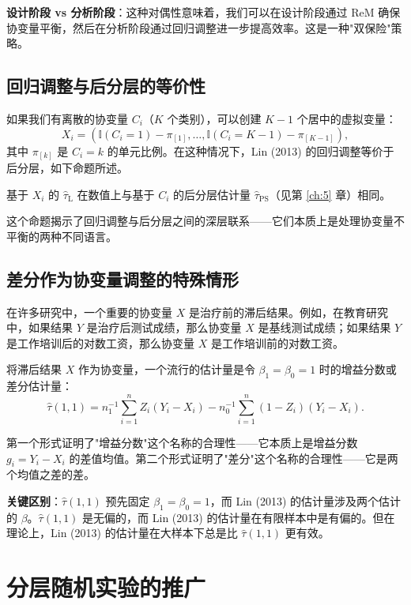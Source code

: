 \textbf{设计阶段 vs 分析阶段}：这种对偶性意味着，我们可以在设计阶段通过 ReM 确保协变量平衡，然后在分析阶段通过回归调整进一步提高效率。这是一种"双保险"策略。

\subsection{回归调整与后分层的等价性}\label{sec:6-equivalence}

如果我们有离散的协变量 $C_i$（$K$ 个类别），可以创建 $K-1$ 个居中的虚拟变量：
\[
X_i = \left( \mathbb{I}(C_i = 1) - \pi_{[1]}, \ldots, \mathbb{I}(C_i = K-1) - \pi_{[K-1]} \right) ,
\]
其中 $\pi_{[k]}$ 是 $C_i = k$ 的单元比例。在这种情况下，Lin (2013) 的回归调整等价于后分层，如下命题所述。

\begin{Proposition}[命题 6.3 — 回归调整与后分层的等价性]\label{prop:6.3}
基于 $X_i$ 的 $\hat{\tau}_{\mathrm{L}}$ 在数值上与基于 $C_i$ 的后分层估计量 $\hat{\tau}_{\mathrm{PS}}$（见第 \ref{ch:5} 章）相同。
\end{Proposition}

这个命题揭示了回归调整与后分层之间的深层联系——它们本质上是处理协变量不平衡的两种不同语言。

\subsection{差分作为协变量调整的特殊情形}\label{sec:6-did}

在许多研究中，一个重要的协变量 $X$ 是治疗前的滞后结果。例如，在教育研究中，如果结果 $Y$ 是治疗后测试成绩，那么协变量 $X$ 是基线测试成绩；如果结果 $Y$ 是工作培训后的对数工资，那么协变量 $X$ 是工作培训前的对数工资。

将滞后结果 $X$ 作为协变量，一个流行的估计量是令 $\beta_1 = \beta_0 = 1$ 时的增益分数或差分估计量：
\[
\hat{\tau}(1,1) = n_1^{-1}\sum_{i=1}^n Z_i (Y_i - X_i) - n_0^{-1}\sum_{i=1}^n (1-Z_i)(Y_i - X_i) .
\]

第一个形式证明了"增益分数"这个名称的合理性——它本质上是增益分数 $g_i = Y_i - X_i$ 的差值均值。第二个形式证明了"差分"这个名称的合理性——它是两个均值之差的差。

\textbf{关键区别}：$\hat{\tau}(1,1)$ 预先固定 $\beta_1 = \beta_0 = 1$，而 Lin (2013) 的估计量涉及两个估计的 $\beta$。$\hat{\tau}(1,1)$ 是无偏的，而 Lin (2013) 的估计量在有限样本中是有偏的。但在理论上，Lin (2013) 的估计量在大样本下总是比 $\hat{\tau}(1,1)$ 更有效。

\section{分层随机实验的推广}\label{sec:6-sre-extension}

